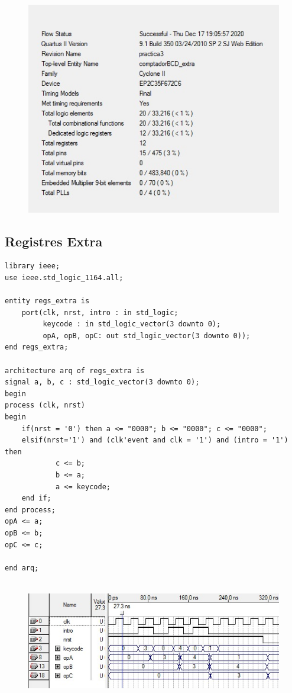\documentclass[12pt, a4papre]{article}
\begin{document}
				\begin{figure}[H]
		\begin{center}
		\includegraphics[width=130mm]{informeComptadorBCDextra.jpeg}
		\end{center}
	\end{figure}	
		

\subsection{Registres Extra}

	\begin{lstlisting}[style=vhdl, frame=single, basicstyle=\tiny]
	library ieee;
use ieee.std_logic_1164.all;

entity regs_extra is
	port(clk, nrst, intro : in std_logic;
		 keycode : in std_logic_vector(3 downto 0);
		 opA, opB, opC: out std_logic_vector(3 downto 0));
end regs_extra;

architecture arq of regs_extra is
signal a, b, c : std_logic_vector(3 downto 0);
begin
process (clk, nrst)
begin 
	if(nrst = '0') then a <= "0000"; b <= "0000"; c <= "0000";
	elsif(nrst='1') and (clk'event and clk = '1') and (intro = '1') then
			c <= b;
			b <= a;
			a <= keycode;
	end if;
end process;
opA <= a;
opB <= b;
opC <= c;

end arq;
	
			\end{lstlisting}
			
						\begin{figure}[H]
		\begin{center}
		\includegraphics[width=130mm]{simularioRegistreExtra.jpeg}
		\end{center}
	\end{figure}	
	
\end{document}
